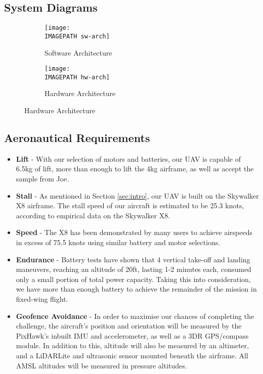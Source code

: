 \subsection{System Diagrams}
\begin{figure}[H]	
	\begin{subfigure}{0.32\textwidth}
		\centerline{\texttt{[image: \\IMAGEPATH sw-arch]}}
		\caption{Software Architecture}
		\label{fig:sw-arch}
	\end{subfigure} %
	\begin{subfigure}{.93\textwidth}
		\centerline{\texttt{[image: \\IMAGEPATH hw-arch]}}
		\caption{Hardware Architecture}
		\label{fig:hw-arch}
	\end{subfigure}
\end{figure}

\subsection{Aeronautical Requirements}
\begin{itemize}
	\item \textbf{Lift} - With our selection of motors and batteries, our UAV is capable of 6.5kg of lift, more than enough to lift the 4kg airframe, as well as accept the sample from Joe.
	\item \textbf{Stall} - As mentioned in Section \ref{sec:intro}, our UAV is built on the Skywalker X8 airframe. The stall speed of our aircraft is estimated to be 25.3 knots, according to empirical data on the Skywalker X8.
	\item \textbf{Speed} - The X8 has been demonstrated by many users to achieve airspeeds in excess of 75.5 knots using similar battery and motor selections.
	\item \textbf{Endurance} - Battery tests have shown that 4 vertical take-off and landing maneuvers, reaching an altitude of 20ft, lasting 1-2 minutes each, consumed only a small portion of total power capacity. Taking this into consideration, we have more than enough battery to achieve the remainder of the mission in fixed-wing flight.
	\item \textbf{Geofence Avoidance} - In order to maximise our chances of completing the challenge, the aircraft's position and orientation will be measured by the PixHawk's inbuilt IMU and accelerometer, as well as a 3DR GPS/compass module. In addition to this, altitude will also be measured by an altimeter, and a LiDARLite and ultrasonic sensor mounted beneath the airframe. All AMSL altitudes will be measured in pressure altitudes.
\end{itemize}

